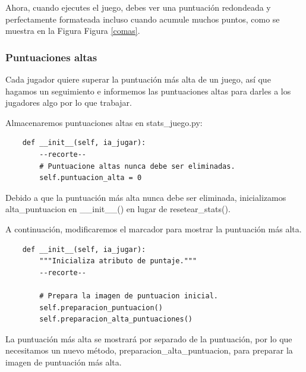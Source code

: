 Ahora, cuando ejecutes el juego, debes ver una puntuación redondeada y perfectamente formateada incluso cuando 
acumule muchos puntos, como se muestra en la Figura Figura \ref{comas}.   



\subsubsection{Puntuaciones altas}

Cada jugador quiere superar la puntuación más alta de un juego, así que hagamos un seguimiento e informemos las puntuaciones altas para darles a los jugadores algo por lo que trabajar.

Almacenaremos puntuaciones altas en {\ttfamily stats\_juego.py}:

\hspace{-2.4cm}{\ttfamily \scriptsize stats}

\vspace{-0.2cm}
\hspace{-2.1cm}{\ttfamily \scriptsize \_juego.py}\vspace{-0.84cm}
\begin{lstlisting}
    def __init__(self, ia_jugar):
        --recorte--	
        # Puntuacione altas nunca debe ser eliminadas. 
        self.puntuacion_alta = 0	
\end{lstlisting}
Debido a que la puntuación más alta nunca debe ser eliminada,  inicializamos {\ttfamily alta\_puntuacion} en {\ttfamily\_\_init\_\_()} en lugar de {\ttfamily resetear\_stats()}. 


A continuación, modificaremos el marcador para mostrar la puntuación más alta. 


\hspace{-2.9cm}{\ttfamily \scriptsize puntuacion.py}  \vspace{-0.5cm}
\begin{lstlisting}		
    def __init__(self, ia_jugar):
        """Inicializa atributo de puntaje.""" 
        --recorte--	
	    
	    # Prepara la imagen de puntuacion inicial. 
	    self.preparacion_puntuacion() 
	    self.preparacion_alta_puntuaciones()	
\end{lstlisting}

La puntuación más alta se mostrará por separado de la puntuación, por lo que necesitamos un nuevo método, 
{\ttfamily preparacion\_alta\_puntuacion}, para preparar la imagen de puntuación más alta.
	  
